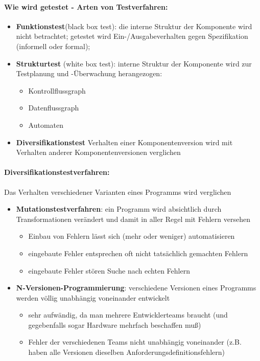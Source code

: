 \paragraph{Wie wird getestet - Arten von Testverfahren:}

\begin{itemize}
	\item \textbf{Funktionstest}(black box test): die interne Struktur der Komponente wird nicht betrachtet; getestet wird Ein-/Ausgabeverhalten gegen Spezifikation (informell oder formal);
	\item \textbf{Strukturtest}  (white box test): interne Struktur der Komponente wird zur Testplanung und -Überwachung herangezogen:
	\begin{itemize}
		\item Kontrollflussgraph
		\item Datenflussgraph
		\item Automaten
	\end{itemize}
	\item \textbf{Diversifikationstest} Verhalten einer Komponentenversion wird mit Verhalten anderer Komponentenversionen verglichen
\end{itemize}

\paragraph{Diversifikationstestverfahren:}

Das Verhalten verschiedener Varianten eines Programms wird verglichen
\begin{itemize}
	\item \textbf{Mutationstestverfahren}: ein Programm wird absichtlich durch Transformationen verändert und damit in aller Regel mit Fehlern versehen
	\begin{itemize}
		\item Einbau von Fehlern lässt sich (mehr oder weniger) automatisieren
		\item eingebaute Fehler entsprechen oft nicht tatsächlich gemachten Fehlern
		\item eingebaute Fehler stören Suche nach echten Fehlern
	\end{itemize}
	\item \textbf{N-Versionen-Programmierung}: verschiedene Versionen eines Programms werden völlig unabhängig voneinander entwickelt
	\begin{itemize}
		\item sehr aufwändig, da man mehrere Entwicklerteams braucht (und gegebenfalls sogar Hardware mehrfach beschaffen muß)
		\item Fehler der verschiedenen Teams nicht unabhängig voneinander (z.B. haben alle Versionen dieselben Anforderungsdefinitionsfehlern)
	\end{itemize}
\end{itemize}

